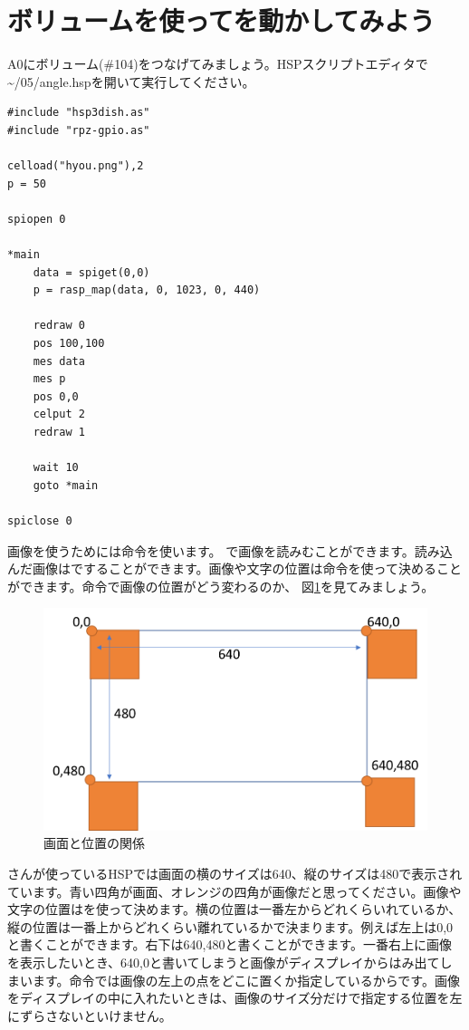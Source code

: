\newpage
\section{ボリュームを使ってを動かしてみよう}
A0にボリューム(\#104)をつなげてみましょう。HSPスクリプトエディタで\textasciitilde /05/angle.hspを開いて実行してください。\\

\begin{lstlisting}[caption=angle.hsp,label=angle.hsp]
#include "hsp3dish.as"
#include "rpz-gpio.as"

celload("hyou.png"),2
p = 50

spiopen 0

*main
	data = spiget(0,0)
	p = rasp_map(data, 0, 1023, 0, 440)

	redraw 0
	pos 100,100
	mes data
	mes p
	pos 0,0
	celput 2
	redraw 1

	wait 10	
	goto *main

spiclose 0
\end{lstlisting}

画像を使うためには命令を使います。
で画像を読みむことができます。読み込んだ画像はですることができます。画像や文字の位置は命令を使って決めることができます。命令で画像の位置がどう変わるのか、 図\ref{angle.hsp}を見てみましょう。

\begin{figure}[H]
\centering
\includegraphics[scale=0.6]{images/chap05/text05-img034.png}
\caption{画面と位置の関係}
\label{angle.hsp}
\end{figure}

さんが使っているHSPでは画面の横のサイズは640、縦のサイズは480で表示されています。青い四角が画面、オレンジの四角が画像だと思ってください。画像や文字の位置はを使って決めます。横の位置は一番左からどれくらいれているか、縦の位置は一番上からどれくらい離れているかで決まります。例えば左上は0,0と書くことができます。右下は640,480と書くことができます。一番右上に画像を表示したいとき、640,0と書いてしまうと画像がディスプレイからはみ出てしまいます。命令では画像の左上の点をどこに置くか指定しているからです。画像をディスプレイの中に入れたいときは、画像のサイズ分だけで指定する位置を左にずらさないといけません。\\

